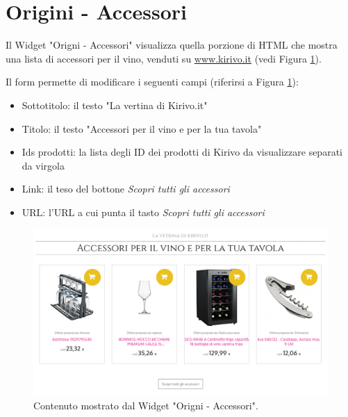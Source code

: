 \newpage
\section{Origini - Accessori}
Il Widget "Origni - Accessori" visualizza quella porzione di HTML
che mostra una lista di accessori per il vino, venduti su \url{www.kirivo.it} (vedi Figura \ref{fig:access}).

Il form permette di modificare i seguenti campi (riferirsi a Figura \ref{fig:access}):
\begin{itemize}
\item Sottotitolo: il testo "La vertina di Kirivo.it"
\item Titolo: il testo "Accessori per il vino e per la tua tavola"
\item Ids prodotti: la lista degli ID dei prodotti di Kirivo da visualizzare separati da virgola
\item Link: il teso del bottone \emph{Scopri tutti gli accessori}
\item URL: l'URL a cui punta il tasto \emph{Scopri tutti gli accessori}
\end{itemize}

\begin{figure}
  \includegraphics[width=\textwidth]{figure/access.png}
  \caption{Contenuto mostrato dal Widget "Origni - Accessori".}
  \label{fig:access}
\end{figure}

